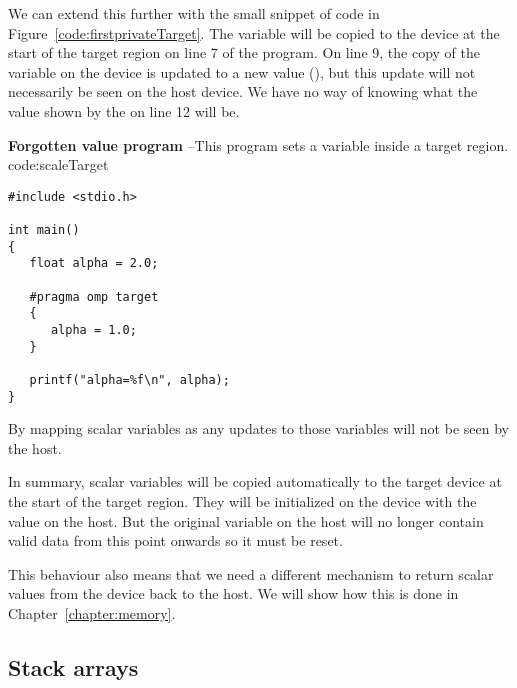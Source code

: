 We can extend this further with the small snippet of code in Figure~\ref{code:firstprivateTarget}.
The  variable will be copied to the device at the start of the target region on line 7 of the program.
On line 9, the copy of the variable on the device is updated to a new value (), but this update will not necessarily be seen on the host device.
We have no way of knowing what the value shown by the  on line 12 will be.

\begin{CodeExample}%
{\textbf{Forgotten value program} --\small This program sets a  variable
inside a target region.
}%
{code:scaleTarget}
\begin{lstlisting}
#include <stdio.h>

int main()
{
   float alpha = 2.0;

   #pragma omp target
   {
      alpha = 1.0;
   }

   printf("alpha=%f\n", alpha);
}	  
\end{lstlisting}
\end{CodeExample}

By mapping scalar variables as  any updates to those variables will not be seen by the host.

In summary, scalar variables will be copied automatically to the target device at the start of the target region.
They will be initialized on the device with the value on the host.
But the original variable on the host will no longer contain valid data from this point onwards so it must be reset.

This behaviour also means that we need a different mechanism to return scalar values from the device back to the host.
We will show how this is done in Chapter~\ref{chapter:memory}.


\subsection{Stack arrays}


